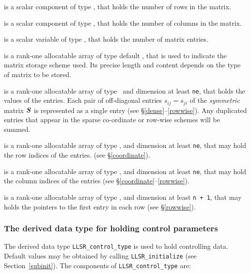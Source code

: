 \documentclass{galahad}
\newcommand{\packagename}{LLSR}
\begin{document}
\begin{description}

 is a scalar component of type \integer,
that holds the number of rows in the matrix.

 is a scalar component of type \integer,
that holds the number of columns in the matrix.

 is a scalar variable of type \integer, that
holds the number of matrix entries.

 is a rank-one allocatable array of type default \character, that
is used to indicate the matrix storage scheme used. Its precise length and
content depends on the type of matrix to be stored.

 is a rank-one allocatable array of type \realdp\,
and dimension at least {\tt ne}, that holds the values of the entries.
Each pair of off-diagonal entries $s_{ij} = s_{ji}$ of the {\em symmetric}
matrix ${\bm{S}}$ is represented as a single entry
(see \S\ref{dense}--\ref{rowwise}).
Any duplicated entries that appear in the sparse
co-ordinate or row-wise schemes will be summed.

 is a rank-one allocatable array of type \integer,
and dimension at least {\tt ne}, that may hold the row indices of the entries.
(see \S\ref{coordinate}).

 is a rank-one allocatable array of type \integer,
and dimension at least {\tt ne}, that may hold the column indices of the entries
(see \S\ref{coordinate}--\ref{rowwise}).

 is a rank-one allocatable array of type \integer,
and dimension at least {\tt n + 1}, that may holds the pointers to
the first entry in each row (see \S\ref{rowwise}).

\end{description}


\subsubsection{The derived data type for holding control
 parameters}\label{typecontrol}
The derived data type
{\tt \packagename\_control\_type}
is used to hold controlling data. Default values may be obtained by calling
{\tt \packagename\_initialize}
(see Section~\ref{subinit}). The components of
{\tt \packagename\_control\_type}
are:
\end{document}
